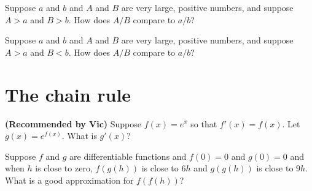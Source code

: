\documentclass{ximera}
\newcommand{\recommendation}[1]{\textbf{(Recommended by #1)}}
\begin{document}
\begin{problem}
  Suppose $a$ and $b$ and $A$ and $B$ are very large, positive numbers, and suppose $A > a$ and $B > b$.  How does $A/B$ compare to $a/b$?
  \begin{multipleChoice}
  \end{multipleChoice}
\end{problem}

\begin{problem}
  Suppose $a$ and $b$ and $A$ and $B$ are very large, positive numbers, and suppose $A > a$ and $B < b$.  How does $A/B$ compare to $a/b$?
  \begin{multipleChoice}
  \end{multipleChoice}
\end{problem}

\clearpage

\section{The chain rule}

\begin{problem}
\recommendation{Vic}
  Suppose $f(x) = e^x$ so that $f'(x) = f(x)$.  Let $g(x) = e^{f(x)}$.  What is $g'(x)$?
  \begin{multipleChoice}
  \end{multipleChoice}
\end{problem}

\begin{problem}
  Suppose $f$ and $g$ are differentiable functions and $f(0) = 0$ and
  $g(0) = 0$ and when $h$ is close to zero, $f(g(h))$ is close to $6h$
  and $g(g(h))$ is close to $9h$.  What is a good approximation for $f(f(h))$?
  \begin{multipleChoice}
  \end{multipleChoice}
\end{problem}
\end{document}
